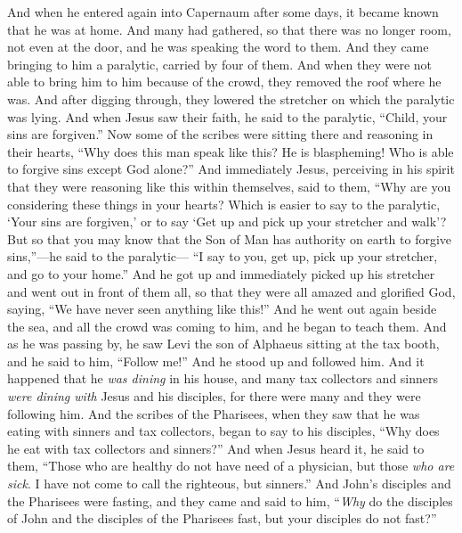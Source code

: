 \begin{biblechapter} %
 And when he entered again into Capernaum after some days, it became known that he was at home.
\verse And many had gathered, so that there was no longer room, not even at the door, and he was speaking the word to them.
\verse And they came bringing to him a paralytic, carried by four of them.
\verse And when they were not able to bring him to him because of the crowd, they removed the roof where he was. And after digging through, they lowered the stretcher on which the paralytic was lying.
\verse And when Jesus saw their faith, he said to the paralytic, “Child, your sins are forgiven.”
\verse Now some of the scribes were sitting there and reasoning in their hearts,
\verse “Why does this man speak like this? He is blaspheming! Who is able to forgive sins except God alone?”
\verse And immediately Jesus, perceiving in his spirit that they were reasoning like this within themselves, said to them, “Why are you considering these things in your hearts?
\verse Which is easier to say to the paralytic, ‘Your sins are forgiven,’ or to say ‘Get up and pick up your stretcher and walk’?
\verse But so that you may know that the Son of Man has authority on earth to forgive sins,”—he said to the paralytic—
\verse “I say to you, get up, pick up your stretcher, and go to your home.”
\verse And he got up and immediately picked up his stretcher and went out in front of them all, so that they were all amazed and glorified God, saying, “We have never seen anything like this!”
 And he went out again beside the sea, and all the crowd was coming to him, and he began to teach them.
\verse And as he was passing by, he saw Levi the son of Alphaeus sitting at the tax booth, and he said to him, “Follow me!” And he stood up and followed him.
\verse And it happened that he \textit{was dining} in his house, and many tax collectors and sinners \textit{were dining with} Jesus and his disciples, for there were many and they were following him.
\verse And the scribes of the Pharisees, when they saw that he was eating with sinners and tax collectors, began to say to his disciples, “Why does he eat with tax collectors and sinners?”
\verse And when Jesus heard it, he said to them, “Those who are healthy do not have need of a physician, but those \textit{who are sick}. I have not come to call the righteous, but sinners.”
 And John’s disciples and the Pharisees were fasting, and they came and said to him, “\textit{Why} do the disciples of John and the disciples of the Pharisees fast, but your disciples do not fast?”

\end{biblechapter}
